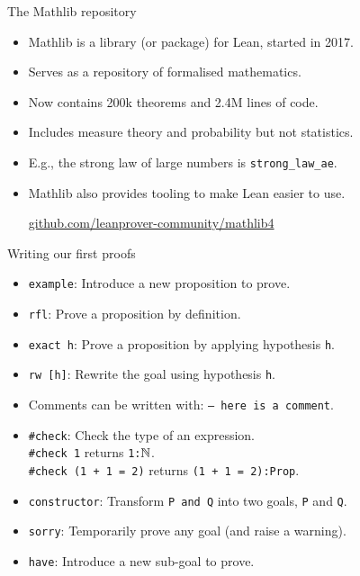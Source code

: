 \documentclass{beamer}
\begin{document}
\begin{frame}{The Mathlib repository}

  \begin{itemize}[<+->]
    \item Mathlib is a library (or package) for Lean, started in 2017.
    \item Serves as a repository of formalised mathematics.
    \item Now contains 200k theorems and 2.4M lines of code.
    \item Includes measure theory and probability but not statistics.
    \item E.g., the strong law of large numbers is
      \texttt{strong\_law\_ae}.
    \item Mathlib also provides tooling to make Lean easier to use.

      \vspace*{4mm}

      \centering
      \hspace*{-10mm}
      \normalsize\url{github.com/leanprover-community/mathlib4}

  \end{itemize}

\end{frame}

\begin{frame}{Writing our first proofs}

  \vspace*{2mm}

  \begin{itemize}[<+(1)->]
    \item \texttt{example}:
      Introduce a new proposition to prove.
    \item \texttt{rfl}:
      Prove a proposition by definition.
    \item \texttt{exact h}:
      Prove a proposition by applying hypothesis \texttt{h}.
    \item \texttt{rw [h]}:
      Rewrite the goal using hypothesis \texttt{h}.
    \item Comments can be written with: \texttt{-- here is a comment}.
    \item \texttt{\#check}:
      Check the type of an expression. \\
      \texttt{\#check 1} returns \texttt{1:}${\mathbb{N}}$. \\
      \texttt{\#check (1 + 1 = 2)} returns \texttt{(1 + 1 = 2):Prop}.
    \item \texttt{constructor}:
      Transform \texttt{P and Q} into two goals, \texttt{P} and \texttt{Q}.
    \item \texttt{sorry}:
      Temporarily prove any goal (and raise a warning).
    \item \texttt{have}:
      Introduce a new sub-goal to prove.
  \end{itemize}

\end{frame}
\end{document}
